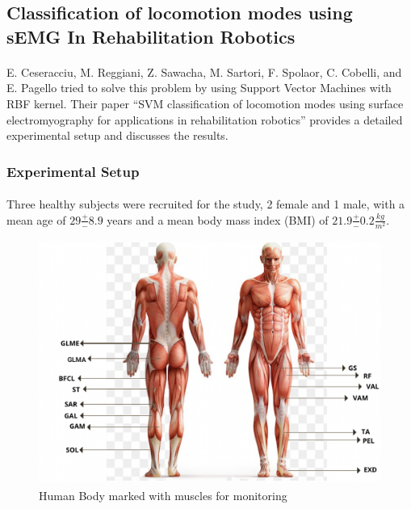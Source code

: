 \documentclass[12pt]{article}
\begin{document}
\newpage

\subsection{Classification of locomotion modes using sEMG In Rehabilitation
	Robotics}

\paragraph{}
E. Ceseracciu, M. Reggiani, Z. Sawacha, M. Sartori, F. Spolaor, C. Cobelli, and E. Pagello tried to solve this problem by using Support Vector Machines with RBF kernel. Their paper “SVM classification of locomotion modes using surface electromyography for applications in rehabilitation robotics” provides a detailed experimental setup and discusses the results. \cite{E. Ceseracciu}


\subsubsection{Experimental Setup}

\paragraph{}
Three healthy subjects were recruited for the study, 2 female and 1 male, with a mean age of $29 \frac{+}{-} 8.9$ years and a mean body mass index (BMI) of $21.9 \frac{+}{-} 0.2 \frac{kg}{m^2}$.\\

\begin{figure}[h]
	\begin{center}
		\includegraphics[height=8cm,width=13cm]{HumanBodyWithMarkedMuscles}
	\end{center}
	\caption{Human Body marked with muscles for monitoring}
\end{figure}
\end{document}
